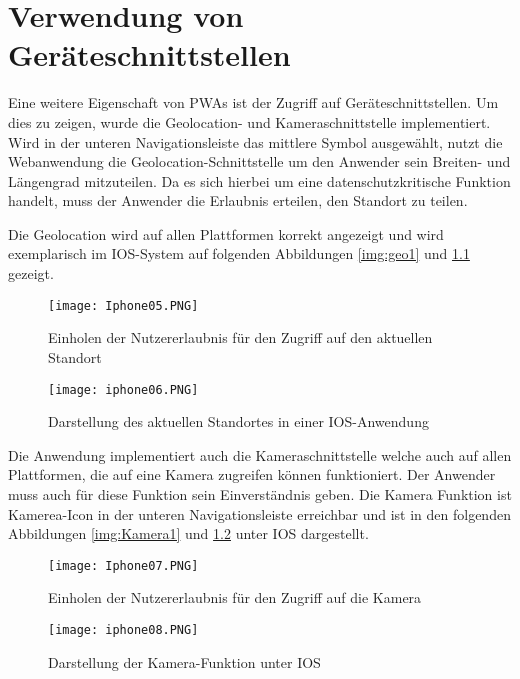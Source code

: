 \chapter{Verwendung von Geräteschnittstellen}

Eine weitere Eigenschaft von PWAs ist der Zugriff auf Geräteschnittstellen. Um dies zu zeigen, wurde die Geolocation- und Kameraschnittstelle implementiert.
Wird in der unteren Navigationsleiste das mittlere Symbol ausgewählt, nutzt die Webanwendung die Geolocation-Schnittstelle um den Anwender sein Breiten- und Längengrad mitzuteilen. Da es sich hierbei um eine datenschutzkritische Funktion handelt, muss der Anwender die Erlaubnis erteilen, den Standort zu teilen. 

Die Geolocation wird auf allen Plattformen korrekt angezeigt und wird exemplarisch im IOS-System auf folgenden Abbildungen \ref{img:geo1} und \ref{img:geo2} gezeigt. 

\begin{figure}[!htb]
    \begin{minipage}[b]{.4\linewidth} %
       \texttt{[image: Iphone05.PNG]}
       \caption{Einholen der Nutzererlaubnis für den Zugriff auf den aktuellen Standort}
       \label{img:geo1}
    \end{minipage}
    \hspace{.1\linewidth}%
    \begin{minipage}[b]{.4\linewidth} %
       \texttt{[image: iphone06.PNG]}
       \caption{Darstellung des aktuellen Standortes in einer IOS-Anwendung}
       \label{img:geo2}
    \end{minipage}
 \end{figure}

 Die Anwendung implementiert auch die Kameraschnittstelle welche auch auf allen Plattformen, die auf eine Kamera zugreifen können funktioniert. Der Anwender muss auch für diese Funktion sein Einverständnis geben. Die Kamera Funktion ist Kamerea-Icon in der unteren Navigationsleiste erreichbar und ist in den folgenden Abbildungen \ref{img:Kamera1} und \ref{img:Kamera2} unter IOS dargestellt.

 \begin{figure}[!htb]
    \begin{minipage}[b]{.4\linewidth} %
       \texttt{[image: Iphone07.PNG]}
       \caption{Einholen der Nutzererlaubnis für den Zugriff auf die Kamera}
       \label{img:Kamera1}
    \end{minipage}
    \hspace{.1\linewidth}%
    \begin{minipage}[b]{.4\linewidth} %
       \texttt{[image: iphone08.PNG]}
       \caption{Darstellung der Kamera-Funktion unter IOS}
       \label{img:Kamera2}
    \end{minipage}
 \end{figure}


